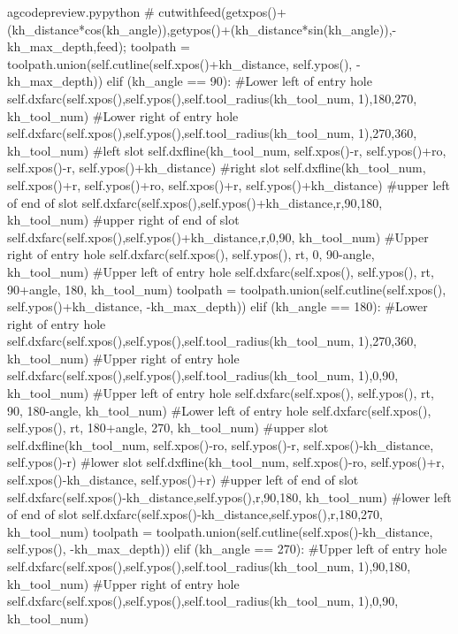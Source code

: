 \documentclass{ltxdoc}
\begin{document}
\begin{writecode}{a}{gcodepreview.py}{python}
{# cutwithfeed(getxpos()+(kh_distance*cos(kh_angle)),getypos()+(kh_distance*sin(kh_angle)),-kh_max_depth,feed);
            toolpath = toolpath.union(self.cutline(self.xpos()+kh_distance, self.ypos(), -kh_max_depth))
        elif (kh_angle == 90):
#Lower left of entry hole
            self.dxfarc(self.xpos(),self.ypos(),self.tool_radius(kh_tool_num, 1),180,270, kh_tool_num)
#Lower right of entry hole
            self.dxfarc(self.xpos(),self.ypos(),self.tool_radius(kh_tool_num, 1),270,360, kh_tool_num)
#left slot
            self.dxfline(kh_tool_num, self.xpos()-r, self.ypos()+ro, self.xpos()-r, self.ypos()+kh_distance)
#right slot
            self.dxfline(kh_tool_num, self.xpos()+r, self.ypos()+ro, self.xpos()+r, self.ypos()+kh_distance)
#upper left of end of slot
            self.dxfarc(self.xpos(),self.ypos()+kh_distance,r,90,180, kh_tool_num)
#upper right of end of slot
            self.dxfarc(self.xpos(),self.ypos()+kh_distance,r,0,90, kh_tool_num)
#Upper right of entry hole
            self.dxfarc(self.xpos(), self.ypos(), rt, 0, 90-angle, kh_tool_num)
#Upper left of entry hole
            self.dxfarc(self.xpos(), self.ypos(), rt, 90+angle, 180, kh_tool_num)
            toolpath = toolpath.union(self.cutline(self.xpos(), self.ypos()+kh_distance, -kh_max_depth))
        elif (kh_angle == 180):
#Lower right of entry hole
            self.dxfarc(self.xpos(),self.ypos(),self.tool_radius(kh_tool_num, 1),270,360, kh_tool_num)
#Upper right of entry hole
            self.dxfarc(self.xpos(),self.ypos(),self.tool_radius(kh_tool_num, 1),0,90, kh_tool_num)
#Upper left of entry hole
            self.dxfarc(self.xpos(), self.ypos(), rt, 90, 180-angle, kh_tool_num)
#Lower left of entry hole
            self.dxfarc(self.xpos(), self.ypos(), rt, 180+angle, 270, kh_tool_num)
#upper slot
            self.dxfline(kh_tool_num, self.xpos()-ro, self.ypos()-r, self.xpos()-kh_distance, self.ypos()-r)
#lower slot
            self.dxfline(kh_tool_num, self.xpos()-ro, self.ypos()+r, self.xpos()-kh_distance, self.ypos()+r)
#upper left of end of slot
            self.dxfarc(self.xpos()-kh_distance,self.ypos(),r,90,180, kh_tool_num)
#lower left of end of slot
            self.dxfarc(self.xpos()-kh_distance,self.ypos(),r,180,270, kh_tool_num)
            toolpath = toolpath.union(self.cutline(self.xpos()-kh_distance, self.ypos(), -kh_max_depth))
        elif (kh_angle == 270):
#Upper left of entry hole
            self.dxfarc(self.xpos(),self.ypos(),self.tool_radius(kh_tool_num, 1),90,180, kh_tool_num)
#Upper right of entry hole
            self.dxfarc(self.xpos(),self.ypos(),self.tool_radius(kh_tool_num, 1),0,90, kh_tool_num)
}
\end{writecode}
\end{document}
